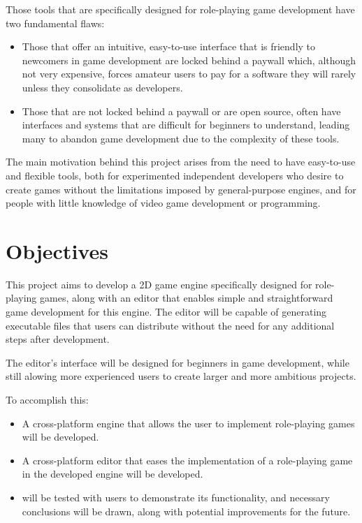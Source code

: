 Those tools that are specifically designed for role-playing game development have two fundamental flaws:
\begin{itemize}
	\item Those that offer an intuitive, easy-to-use interface that is friendly to newcomers in game development are locked behind a paywall which, although not very expensive, forces amateur users to pay for a software they will rarely unless they consolidate as developers.
	\item Those that are not locked behind a paywall or are open source, often have interfaces and systems that are difficult for beginners to understand, leading many to abandon game development due to the complexity of these tools.
\end{itemize}

\medskip

The main motivation behind this project arises from the need to have easy-to-use and flexible tools, both for experimented independent developers who desire to create games without the limitations imposed by general-purpose engines, and for people with little knowledge of video game development or programming.

\section*{Objectives}
This project aims to develop a 2D game engine specifically designed for role-playing games, along with an editor that enables simple and straightforward game development for this engine. The editor will be capable of generating executable files that users can distribute without the need for any additional steps after development.

\smallskip

The editor's interface will be designed for beginners in game development, while still alowing more experienced users to create larger and more ambitious projects.

\medskip

To accomplish this:
\begin{itemize}
	\item A cross-platform engine that allows the user to implement role-playing games will be developed.
	\item A cross-platform editor that eases the implementation of a role-playing game in the developed engine will be developed.
	\item \baker{} will be tested with users to demonstrate its functionality, and necessary conclusions will be drawn, along with potential improvements for the future.
\end{itemize}

